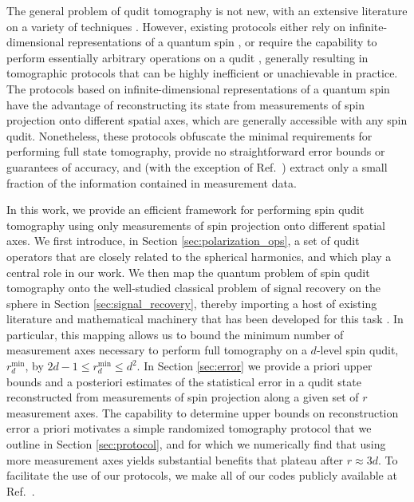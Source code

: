 \documentclass[a4paper,twocolumn,unpublished]{quantumarticle}
\renewcommand{\t}{\text} %
\begin{document}
The general problem of qudit tomography is not new, with an extensive literature on a variety of techniques \cite{manko1997spin, schmied2011tomographic, evrard2019enhanced, flammia2005minimal, thew2002qudit, salazar2012quantum, sosa-martinez2017quantum, ha2018minimal, stefano2019set, palici2020oam}.
However, existing protocols either rely on infinite-dimensional representations of a quantum spin \cite{manko1997spin, schmied2011tomographic, evrard2019enhanced}, or require the capability to perform essentially arbitrary operations on a qudit \cite{thew2002qudit, flammia2005minimal, salazar2012quantum, sosa-martinez2017quantum, ha2018minimal, stefano2019set, palici2020oam}, generally resulting in tomographic protocols that can be highly inefficient or unachievable in practice.
The protocols based on infinite-dimensional representations of a quantum spin have the advantage of reconstructing its state from measurements of spin projection onto different spatial axes, which are generally accessible with any spin qudit.
Nonetheless, these protocols obfuscate the minimal requirements for performing full state tomography, provide no straightforward error bounds or guarantees of accuracy, and (with the exception of Ref.~\cite{schmied2011tomographic}) extract only a small fraction of the information contained in measurement data.

In this work, we provide an efficient framework for performing spin qudit tomography using only measurements of spin projection onto different spatial axes.
We first introduce, in Section \ref{sec:polarization_ops}, a set of qudit operators that are closely related to the spherical harmonics, and which play a central role in our work.
We then map the quantum problem of spin qudit tomography onto the well-studied classical problem of signal recovery on the sphere in Section \ref{sec:signal_recovery}, thereby importing a host of existing literature and mathematical machinery that has been developed for this task \cite{mcewen2011novel, rauhut2011sparse, alem2012sparse, khalid2014optimaldimensionality}.
In particular, this mapping allows us to bound the minimum number of measurement axes necessary to perform full tomography on a $d$-level spin qudit, $r_d^{\t{min}}$, by $2d-1\le r_d^{\t{min}}\le d^2$.
In Section \ref{sec:error} we provide a priori upper bounds and a posteriori estimates of the statistical error in a qudit state reconstructed from measurements of spin projection along a given set of $r$ measurement axes.
The capability to determine upper bounds on reconstruction error a priori motivates a simple randomized tomography protocol that we outline in Section \ref{sec:protocol}, and for which we numerically find that using more measurement axes yields substantial benefits that plateau after $r\approx3d$.
To facilitate the use of our protocols, we make all of our codes publicly available at Ref.~\cite{codes}.
\end{document}
